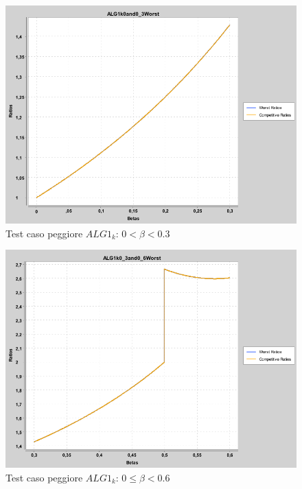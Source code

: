 \documentclass[12pt]{article}
\begin{document}
\begin{figure}[H]
\caption{Test caso peggiore $ALG1_{k}$: $0 < \beta < 0.3$}
\centering
\includegraphics[scale=0.4]{worst/ALG1k0and0_3Worst.png}
\end{figure}
\begin{figure}[H]
\caption{Test caso peggiore $ALG1_{k}$: $0 \leq \beta < 0.6$}
\centering
\includegraphics[scale=0.4]{worst/ALG1k0_3and0_6Worst.png}
\end{figure}
\end{document}
